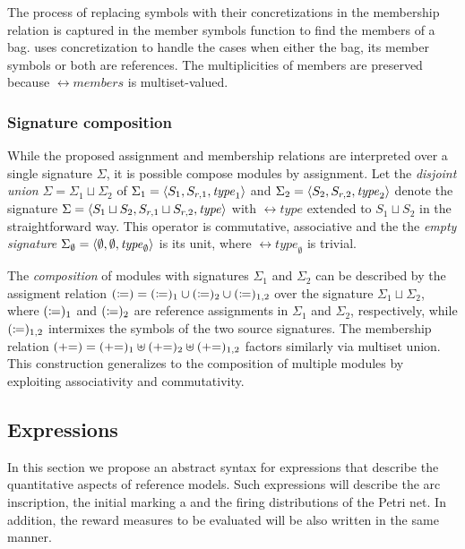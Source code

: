 The process of replacing symbols with their concretizations in the membership relation is captured in the member symbols function to find the members of a bag.  uses concretization to handle the cases when either the bag, its member symbols or both are references. The multiplicities of members are preserved because \(\rel{members}\) is multiset-valued.

\subsubsection{Signature composition}

While the proposed assignment and membership relations are interpreted over a single signature \(\Sigma\), it is possible compose modules by  assignment. Let the \emph{disjoint union} \(\Sigma = \Sigma_1 \sqcup \Sigma_2\) of \(\Sigma_1 = \langle S_1, S_{r,1}, \textrm{\itshape type\/}_1 \rangle\) and \(\Sigma_2 = \langle S_2, S_{r,2}, \textrm{\itshape type\/}_2 \rangle\) denote the signature \(\Sigma = \langle S_1 \sqcup S_2, S_{r,1} \sqcup S_{r,2}, \textrm{\itshape type\/} \rangle\) with \(\rel{type}\) extended to \(S_1 \sqcup S_2\) in the straightforward way. This operator is commutative, associative and the the \emph{empty signature} \(\Sigma_\emptyset = \langle \emptyset, \emptyset, \textrm{\itshape type\/}_\emptyset\rangle\) is its unit, where \(\rel{type}_\emptyset\) is trivial.

The \emph{composition} of  modules with signatures \(\Sigma_1\) and \(\Sigma_2\) can be described by the assigment relation \((\coloneq) = (\coloneq)_1 \cup (\coloneq)_2 \cup (\coloneq)_{1,2}\) over the signature \(\Sigma_1 \sqcup \Sigma_2\), where \((\coloneq)_1\) and \((\coloneq)_2\) are reference assignments in \(\Sigma_1\) and \(\Sigma_2\), respectively, while \((\coloneq)_{1,2}\) intermixes the symbols of the two source signatures. The membership relation \((\mathrel{{+}{=}}) = (\mathrel{{+}{=}})_1 \uplus (\mathrel{{+}{=}})_2 \uplus (\mathrel{{+}{=}})_{1,2}\) factors similarly via multiset union. This construction generalizes to the composition of multiple modules by exploiting associativity and commutativity.

\subsection{Expressions}

In this section we propose an abstract syntax for expressions that describe the quantitative aspects of reference  models. Such expressions will describe the arc inscription, the initial marking a and the firing distributions of the Petri net. In addition, the reward measures to be evaluated will be also written in the same manner.

